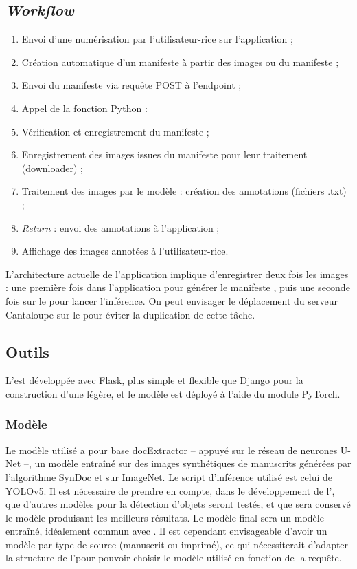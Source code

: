 	\subsection{\textit{Workflow}}
		\begin{enumerate}
		\item Envoi d’une numérisation par l’utilisateur-rice sur l’application \eida ;
		\item Création automatique d’un manifeste \iiif à partir des images ou du manifeste ;
		\item Envoi du manifeste \iiif via requête \http POST à l’\api endpoint ;
		\item Appel de la fonction Python : 
		\item Vérification et enregistrement du manifeste ;
		\item Enregistrement des images issues du manifeste pour leur traitement (\iiif downloader) ;
		\item Traitement des images par le modèle : création des annotations (fichiers .txt) ;
		\item \textit{Return} : envoi des annotations à l’application ;
		\item Affichage des images annotées à l’utilisateur-rice.
		\end{enumerate}
	
	L’architecture actuelle de l’application implique d’enregistrer deux fois les images : une première fois dans l’application \eida pour générer le manifeste \iiif,  puis une seconde fois sur le \gpu pour lancer l’inférence. On peut envisager le déplacement du serveur Cantaloupe sur le \gpu pour éviter la duplication de cette tâche.

	\subsection{Outils}
	L’\api est développée avec Flask, plus simple et flexible que Django pour la construction d’une \api légère, et le modèle est déployé à l’aide du module PyTorch.

		\subsubsection{Modèle}
		Le modèle utilisé a pour base docExtractor – appuyé sur le réseau de neurones U-Net –, un modèle entraîné sur des images synthétiques de manuscrits générées par l’algorithme SynDoc et sur ImageNet. Le script d’inférence utilisé est celui de YOLOv5.
		Il est nécessaire de prendre en compte, dans le développement de l’\api, que d’autres modèles pour la détection d’objets seront testés, et que sera conservé le modèle produisant les meilleurs résultats. 
		Le modèle final sera un modèle entraîné, idéalement commun avec \vhs. Il est cependant envisageable d’avoir un modèle par type de source (manuscrit ou imprimé), ce qui nécessiterait d'adapter la structure de l'\api pour pouvoir choisir le modèle utilisé en fonction de la requête.
		
